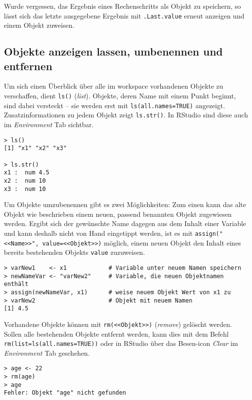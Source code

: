 Wurde vergessen, das Ergebnis eines Rechenschritts als Objekt zu speichern, so lässt sich das letzte ausgegebene Ergebnis mit \lstinline!.Last.value! erneut anzeigen und einem Objekt zuweisen.

\subsection{Objekte anzeigen lassen, umbenennen und entfernen}
\label{sec:objRename}

Um sich einen Überblick über alle im workspace vorhandenen Objekte zu verschaffen, dient \lstinline!ls()! (\emph{list}). Objekte, deren Name mit einem Punkt beginnt, sind dabei versteckt -- sie werden erst mit \lstinline!ls(all.names=TRUE)! angezeigt. Zusatzinformationen zu jedem Objekt zeigt  \lstinline!ls.str()!. In RStudio sind diese auch im \emph{Environment} Tab sichtbar.
\begin{lstlisting}
> ls()
[1] "x1" "x2" "x3"

> ls.str()
x1 :  num 4.5
x2 :  num 10
x3 :  num 10
\end{lstlisting}

Um Objekte umzubenennen gibt es zwei Möglichkeiten: Zum einen kann das alte Objekt wie beschrieben einem neuen, passend benannten Objekt zugewiesen werden. Ergibt sich der gewünschte Name dagegen aus dem Inhalt einer Variable und kann deshalb nicht von Hand eingetippt werden, ist es mit  \lstinline!assign("<<Name>>", value=<<Objekt>>)! möglich, einem neuen Objekt den Inhalt eines bereits bestehenden Objekts \lstinline!value! zuzuweisen.
\begin{lstlisting}
> varNew1    <- x1            # Variable unter neuem Namen speichern
> newNameVar <- "varNew2"     # Variable, die neuen Objektnamen enthält
> assign(newNameVar, x1)      # weise neuem Objekt Wert von x1 zu
> varNew2                     # Objekt mit neuem Namen
[1] 4.5
\end{lstlisting}

Vorhandene Objekte können mit \lstinline!rm(<<Objekt>>)! (\emph{remove}) gelöscht werden. Sollen alle bestehenden Objekte entfernt werden, kann dies mit dem Befehl \lstinline!rm(list=ls(all.names=TRUE))! oder in RStudio über das Besen-icon \emph{Clear} im \emph{Environment} Tab geschehen.
\begin{lstlisting}
> age <- 22
> rm(age)
> age
Fehler: Objekt "age" nicht gefunden
\end{lstlisting}

